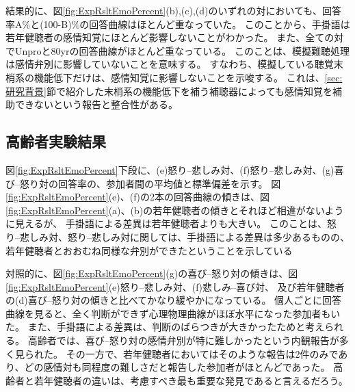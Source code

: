 結果的に、図\ref{fig:ExpRsltEmoPercent}(b),(c),(d)のいずれの対においても、回答率A\%と(100-B)\%の回答曲線はほとんど重なっていた。
このことから、手掛語は若年健聴者の感情知覚にほとんど影響しないことがわかった。
また、全ての対でUnproと80yrの回答曲線がほとんど重なっている。
このことは、模擬難聴処理は感情弁別に影響していないことを意味する。
すなわち、模擬している聴覚末梢系の機能低下だけは、感情知覚に影響しないことを示唆する。
これは、\ref{sec:研究背景}節で紹介した末梢系の機能低下を補う補聴器によっても感情知覚を補助できないという報告\cite{goy2018hearing}と整合性がある。


\subsection{高齢者実験結果}
図\ref{fig:ExpRsltEmoPercent}下段に、(e)怒り--悲しみ対、(f)怒り--悲しみ対、(g)喜び--怒り対の回答率の、参加者間の平均値と標準偏差を示す。
図\ref{fig:ExpRsltEmoPercent}(e)、(f)の2本の回答曲線の傾きは、図\ref{fig:ExpRsltEmoPercent}(a)、(b)の若年健聴者の傾きとそれほど相違がないように見えるが、
手掛語による差異は若年健聴者よりも大きい。
このことは、怒り--悲しみ対、怒り--悲しみ対に関しては、手掛語による差異は多少あるものの、若年健聴者とおおむね同様な弁別ができたということを示している

対照的に、図\ref{fig:ExpRsltEmoPercent}(g)の喜び--怒り対の傾きは、図\ref{fig:ExpRsltEmoPercent}(e)怒り--悲しみ対、(f)悲しみ--喜び対、
及び若年健聴者の(d)喜び--怒り対の傾きと比べてかなり緩やかになっている。
個人ごとに回答曲線を見ると、全く判断ができず心理物理曲線がほぼ水平になった参加者もいた。
また、手掛語による差異は、判断のばらつきが大きかったためと考えられる。
高齢者では、喜び--怒り対の感情弁別が特に難しかったという内観報告が多く見られた。
その一方で、若年健聴者においてはそのような報告は2件のみであり、どの感情対も同程度の難しさだと報告した参加者がほとんどであった。
高齢者と若年健聴者の違いは、考慮すべき最も重要な発見であると言えるだろう。






\clearpage
